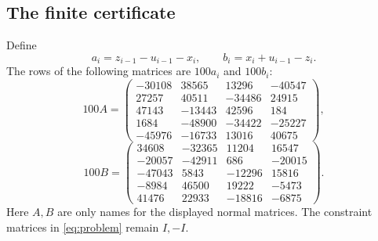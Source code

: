 \documentclass[11pt,a4paper]{article}
\theoremstyle{remark}
\begin{document}
\subsection{The finite certificate}
Define
\begin{equation}\label{eq:normals}
a_i=z_{i-1}-u_{i-1}-x_i,\qquad b_i=x_i+u_{i-1}-z_i.
\end{equation}
The rows of the following matrices are $100a_i$ and $100b_i$:
\begin{equation}\label{eq:normalA}
100A=\begin{pmatrix}
-30108&38565&13296&-40547\\27257&40511&-34486&24915\\47143&-13443&42596&184\\1684&-48900&-34422&-25227\\-45976&-16733&13016&40675
\end{pmatrix},
\end{equation}
\begin{equation}\label{eq:normalB}
100B=\begin{pmatrix}
34608&-32365&11204&16547\\-20057&-42911&686&-20015\\-47043&5843&-12296&15816\\-8984&46500&19222&-5473\\41476&22933&-18816&-6875
\end{pmatrix}.
\end{equation}
Here $A,B$ are only names for the displayed normal matrices. The constraint matrices in \eqref{eq:problem} remain $I,-I$.
\end{document}
